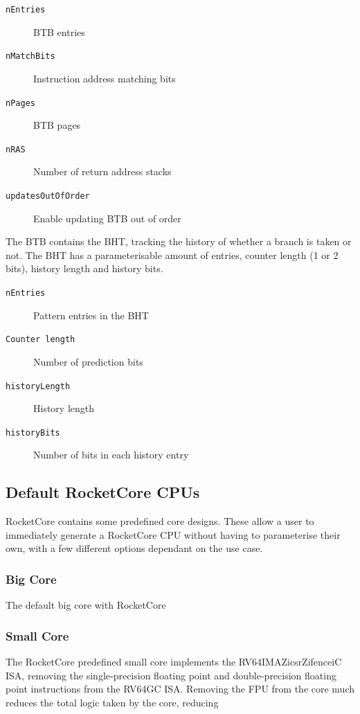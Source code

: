 \begin{description}
    \item[\texttt{nEntries}] BTB entries
    \item[\texttt{nMatchBits}] Instruction address matching bits
    \item[\texttt{nPages}] BTB pages
    \item[\texttt{nRAS}] Number of return address stacks
    \item[\texttt{updatesOutOfOrder}] Enable updating BTB out of order
\end{description}

The BTB contains the BHT, tracking the history of whether a branch is taken or not. The BHT has a parameterisable amount of entries, counter length (1 or 2 bits), history length and history bits.

\begin{description}
    \item[\texttt{nEntries}] Pattern entries in the BHT
    \item[\texttt{Counter length}] Number of prediction bits
    \item[\texttt{historyLength}] History length
    \item[\texttt{historyBits}] Number of bits in each history entry
\end{description}

\subsection{Default RocketCore CPUs}
RocketCore contains some predefined core designs. These allow a user to immediately generate a RocketCore CPU without having to parameterise their own, with a few different options dependant on the use case.

\subsubsection{Big Core}
The default big core with RocketCore

\subsubsection{Small Core}
The RocketCore predefined small core implements the RV64IMAZicsrZifenceiC ISA, removing the single-precision floating point and double-precision floating point instructions from the RV64GC ISA. Removing the FPU from the core much reduces the total logic taken by the core, reducing 

